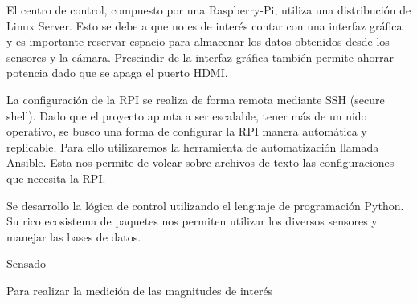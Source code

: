 El centro de control, compuesto por una Raspberry-Pi, utiliza una distribución de Linux Server. Esto se debe a que no es de interés contar con una interfaz gráfica y es importante reservar espacio para almacenar los datos obtenidos desde los sensores y la cámara. 
Prescindir de la interfaz gráfica también permite ahorrar potencia dado que se apaga el puerto HDMI.


La configuración de la RPI se realiza de forma remota mediante SSH (secure shell).
Dado que el proyecto apunta a ser escalable, tener más de un nido operativo, se busco una forma de configurar la RPI manera automática y replicable. Para ello utilizaremos la herramienta  de automatización llamada Ansible. Esta nos permite de volcar sobre archivos de texto las configuraciones que necesita la RPI.

Se desarrollo la lógica de control utilizando el lenguaje de programación Python. Su rico ecosistema de paquetes nos permiten utilizar los diversos sensores y manejar las bases de datos.

Sensado

Para realizar la medición de las magnitudes de interés 











